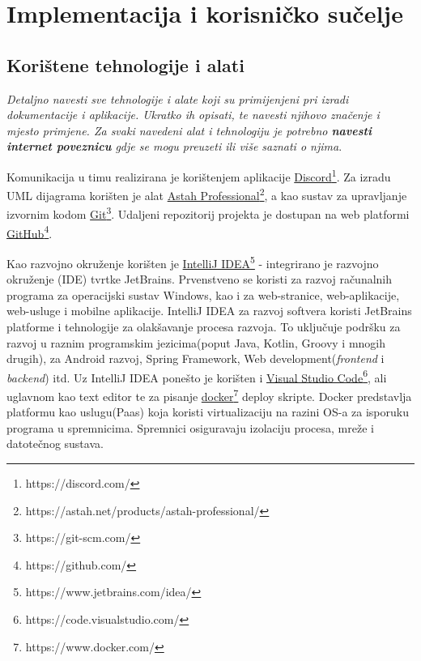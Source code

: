 \chapter{Implementacija i korisničko sučelje}
		
		
		\section{Korištene tehnologije i alati}
			
			 \textit{Detaljno navesti sve tehnologije i alate koji su primijenjeni pri izradi dokumentacije i aplikacije. Ukratko ih opisati, te navesti njihovo značenje i mjesto primjene. Za svaki navedeni alat i tehnologiju je potrebno \textbf{navesti internet poveznicu} gdje se mogu preuzeti ili više saznati o njima}.
			 
			 Komunikacija u timu realizirana je korištenjem aplikacije \underline{Discord}\footnote{https://discord.com/}. Za izradu UML dijagrama korišten je alat \underline{Astah Professional}\footnote{https://astah.net/products/astah-professional/}, a kao sustav za upravljanje izvornim kodom \underline{Git}\footnote{https://git-scm.com/}. Udaljeni repozitorij projekta je dostupan na web platformi \underline{GitHub}\footnote{https://github.com/}.
			 
			 Kao razvojno okruženje korišten je \underline{IntelliJ IDEA}\footnote{https://www.jetbrains.com/idea/} - integrirano je razvojno \newline okruženje (IDE) tvrtke JetBrains. Prvenstveno se koristi za razvoj računalnih programa za operacijski sustav Windows, kao i za web-stranice, web-aplikacije, web-usluge i mobilne aplikacije. IntelliJ IDEA za razvoj softvera koristi JetBrains platforme i tehnologije za olakšavanje procesa razvoja. To uključuje podršku za razvoj u raznim programskim jezicima(poput Java, Kotlin, Groovy i mnogih drugih), za Android razvoj, Spring Framework, Web development(\textit{frontend} i \textit{backend}) itd. Uz IntelliJ IDEA ponešto je korišten i \underline{Visual Studio Code}\footnote{https://code.visualstudio.com/}, ali uglavnom kao text editor te za pisanje \underline{docker}\footnote{https://www.docker.com/} deploy skripte. Docker predstavlja platformu kao uslugu(Paas) koja koristi virtualizaciju na razini OS-a za isporuku programa u spremnicima. Spremnici osiguravaju izolaciju procesa, mreže i datotečnog sustava.
			 

